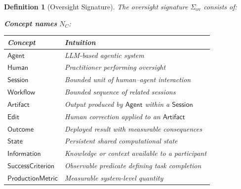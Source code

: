 \documentclass[11pt]{article}
\newtheorem{definition}{Definition}[section]
\begin{document}
\begin{definition}[Oversight Signature]
\label{def:signature}
The oversight signature $\Sigma_{\mathrm{ov}}$ consists of:

\medskip\noindent
\textbf{Concept names} $N_C$:
\begin{center}
\begin{tabular}{@{}ll@{}}
\toprule
\textbf{Concept} & \textbf{Intuition} \\
\midrule
$\mathsf{Agent}$         & LLM-based agentic system \\
$\mathsf{Human}$         & Practitioner performing oversight \\
$\mathsf{Session}$       & Bounded unit of human--agent interaction \\
$\mathsf{Workflow}$      & Bounded sequence of related sessions \\
$\mathsf{Artifact}$      & Output produced by $\mathsf{Agent}$ within a $\mathsf{Session}$ \\
$\mathsf{Edit}$          & Human correction applied to an $\mathsf{Artifact}$ \\
$\mathsf{Outcome}$       & Deployed result with measurable consequences \\
$\mathsf{State}$         & Persistent shared computational state \\
$\mathsf{Information}$   & Knowledge or context available to a participant \\
$\mathsf{SuccessCriterion}$ & Observable predicate defining task completion \\
$\mathsf{ProductionMetric}$ & Measurable system-level quantity \\
\bottomrule
\end{tabular}
\end{center}


\end{definition}
\end{document}
